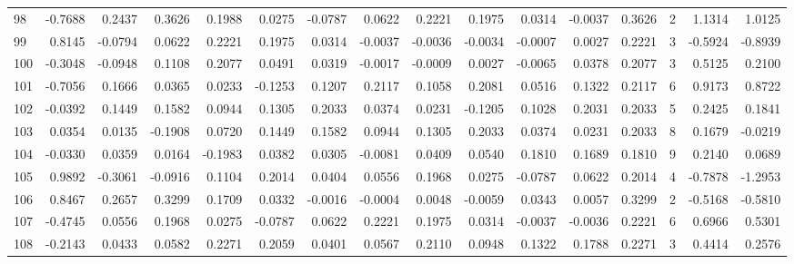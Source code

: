 \begin{tabular}{lrrrrrrrrrrrrrrr}
98  &     -0.7688 &  0.2437 &  0.3626 &  0.1988 &  0.0275 & -0.0787 &  0.0622 &  0.2221 &  0.1975 &  0.0314 &  -0.0037 &     0.3626 &      2 &                    1.1314 &                     1.0125 \\
99  &      0.8145 & -0.0794 &  0.0622 &  0.2221 &  0.1975 &  0.0314 & -0.0037 & -0.0036 & -0.0034 & -0.0007 &   0.0027 &     0.2221 &      3 &                   -0.5924 &                    -0.8939 \\
100 &     -0.3048 & -0.0948 &  0.1108 &  0.2077 &  0.0491 &  0.0319 & -0.0017 & -0.0009 &  0.0027 & -0.0065 &   0.0378 &     0.2077 &      3 &                    0.5125 &                     0.2100 \\
101 &     -0.7056 &  0.1666 &  0.0365 &  0.0233 & -0.1253 &  0.1207 &  0.2117 &  0.1058 &  0.2081 &  0.0516 &   0.1322 &     0.2117 &      6 &                    0.9173 &                     0.8722 \\
102 &     -0.0392 &  0.1449 &  0.1582 &  0.0944 &  0.1305 &  0.2033 &  0.0374 &  0.0231 & -0.1205 &  0.1028 &   0.2031 &     0.2033 &      5 &                    0.2425 &                     0.1841 \\
103 &      0.0354 &  0.0135 & -0.1908 &  0.0720 &  0.1449 &  0.1582 &  0.0944 &  0.1305 &  0.2033 &  0.0374 &   0.0231 &     0.2033 &      8 &                    0.1679 &                    -0.0219 \\
104 &     -0.0330 &  0.0359 &  0.0164 & -0.1983 &  0.0382 &  0.0305 & -0.0081 &  0.0409 &  0.0540 &  0.1810 &   0.1689 &     0.1810 &      9 &                    0.2140 &                     0.0689 \\
105 &      0.9892 & -0.3061 & -0.0916 &  0.1104 &  0.2014 &  0.0404 &  0.0556 &  0.1968 &  0.0275 & -0.0787 &   0.0622 &     0.2014 &      4 &                   -0.7878 &                    -1.2953 \\
106 &      0.8467 &  0.2657 &  0.3299 &  0.1709 &  0.0332 & -0.0016 & -0.0004 &  0.0048 & -0.0059 &  0.0343 &   0.0057 &     0.3299 &      2 &                   -0.5168 &                    -0.5810 \\
107 &     -0.4745 &  0.0556 &  0.1968 &  0.0275 & -0.0787 &  0.0622 &  0.2221 &  0.1975 &  0.0314 & -0.0037 &  -0.0036 &     0.2221 &      6 &                    0.6966 &                     0.5301 \\
108 &     -0.2143 &  0.0433 &  0.0582 &  0.2271 &  0.2059 &  0.0401 &  0.0567 &  0.2110 &  0.0948 &  0.1322 &   0.1788 &     0.2271 &      3 &                    0.4414 &                     0.2576 \\

\end{tabular}
